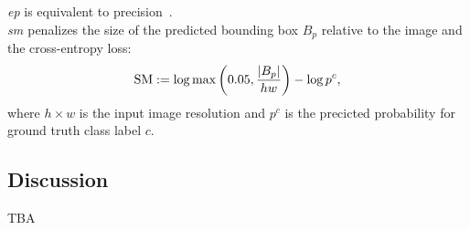 \emph{\gls{ep}\autocite{wang2020score}} is equivalent to precision~.\\

\emph{\gls{sm} \autocite{dabkowski2017real}} penalizes the size of the predicted bounding
 box $B_p$ relative to the image and the cross-entropy
 loss:
\begin{equation}
	\operatorname{SM} \mathrel{:=} \log \max\left({ 0.05, \frac{\left|{B_p}\right|}{hw} }\right) - \log p^c,
\label{eq:sm}
\end{equation}
where $h \times w$ is the input image resolution and $p^c$ is the precicted probability for ground 
truth class label $c$.

\subsection{Discussion}
TBA